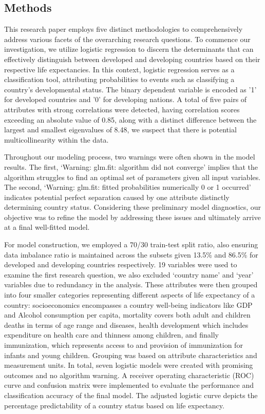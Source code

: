 \documentclass[12pt]{article}
\begin{document}
\begin{multicols}{2}
\section{Methods}
This research paper employs five distinct methodologies to comprehensively address various facets of the overarching research questions. To commence our investigation, we utilize logistic regression to discern the determinants that can effectively distinguish between developed and developing countries based on their respective life expectancies. In this context, logistic regression serves as a classification tool, attributing probabilities to events such as classifying a country's developmental status. The binary dependent variable is encoded as '1' for developed countries and '0' for developing nations. A total of five pairs of attributes with strong correlations were detected, having correlation scores exceeding an absolute value of 0.85, along with a distinct difference between the largest and smallest eigenvalues of 8.48, we suspect that there is potential multicollinearity within the data. 

Throughout our modeling process, two warnings were often shown in the model results. The first, ‘Warning: glm.fit: algorithm did not converge’ implies that the algorithm struggles to find an optimal set of parameters given all input variables. The second, ‘Warning: glm.fit: fitted probabilities numerically 0 or 1 occurred’ indicates potential perfect separation caused by one attribute distinctly determining country status. Considering these preliminary model diagnostics, our objective was to refine the model by addressing these issues and ultimately arrive at a final well-fitted model.

For model construction, we employed a 70/30 train-test split ratio, also ensuring data imbalance ratio is maintained across the subsets given 13.5\% and 86.5\% for developed and developing countries respectively. 19 variables were used to examine the first research question, we also excluded ‘country name’ and ‘year’ variables due to redundancy in the analysis. These attributes were then grouped into four smaller categories representing different aspects of life expectancy of a country: socioeconomics encompasses a country well-being indicators like GDP and Alcohol consumption per capita, mortality covers both adult and children deaths in terms of age range and diseases, health development which includes expenditure on health care and thinness among children, and finally immunization, which represents access to and provision of immunization for infants and young children. Grouping was based on attribute characteristics and measurement units. In total, seven logistic models were created with promising outcomes and no algorithm warning. A receiver operating characteristic (ROC) curve and confusion matrix were implemented to evaluate the performance and classification accuracy of the final model. The adjusted logistic curve depicts the percentage predictability of a country status based on life expectancy.  


\end{multicols}
\end{document}
